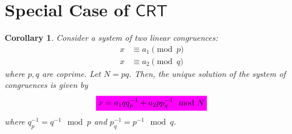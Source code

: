 \documentclass{article}
\newcommand{\mathcolorbox}[2]{\colorbox{#1}{$\displaystyle #2$}}
\newcommand{\inv}[1]{#1^{-1}}
\newtheorem*{theorem*}{Theorem}
\newtheorem*{corollary*}{Corollary}
\theoremstyle{definition}
\newtheorem{remark}{Remark}
\newcommand{\Z}{\mathbb{Z}}
\newcommand{\of}[1]{\left( #1 \right)}
\begin{document}
\section{Special Case of $\mathsf{CRT}$}

\begin{tcolorbox}[colback=white,colframe=corcolor,arc=5pt,title={\color{white}\bf $\mathsf{CRT}$ - Special Case}]
	\begin{corollary*}
		Consider a system of two linear congruences:
		\begin{align*}
			x&\equiv a_1 \pmod{p}\\
			x&\equiv a_2 \pmod{q}
		\end{align*} where $p,q$ are coprime. Let $N=pq$. Then, the unique solution of the system of congruences is given by \begin{align*}
			\mathcolorbox{-green}{x=a_1qq_p^{-1}+a_2pp_q^{-1}\mod{N}}
		\end{align*} where $q_p^{-1}=\inv{q}\mod{p}$ and $p_{q}^{-1}=\inv{p}\mod{q}$.
	\end{corollary*}
\end{tcolorbox}

\end{document}
